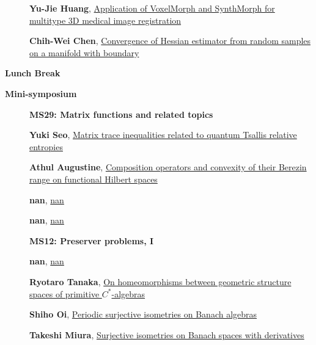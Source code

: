 \documentclass[ILAS2025-program.tex]{subfiles}
\begin{document}
\begin{description}
\begin{description}
        \item[] \hypertarget{up0151}{}\textbf{Yu-Jie Huang}, \hyperlink{down0151}{Application of VoxelMorph and SynthMorph for multitype 3D medical image registration}
        \item[] \hypertarget{up0152}{}\textbf{Chih-Wei Chen}, \hyperlink{down0152}{Convergence of Hessian estimator from random samples on a manifold with boundary}
        \end{description}
    \item[\info{12:00\textrm{--}13:30}] \textbf{Lunch Break} \info{}
    \item[\info{13:30\textrm{--}15:30}] \textbf{Mini-symposium} 
    \begin{description}
    \item[] {\color{mstitle}\textbf{MS29: Matrix functions and related topics}} 
    \item[] \hypertarget{up0157}{}\textbf{Yuki Seo}, \hyperlink{down0157}{Matrix trace inequalities related to quantum Tsallis relative entropies
}
        \item[] \hypertarget{up0158}{}\textbf{Athul Augustine}, \hyperlink{down0158}{Composition operators and convexity of their Berezin range on functional Hilbert spaces}
        \item[] \hypertarget{up0159}{}\textbf{nan}, \hyperlink{down0159}{nan}
        \item[] \hypertarget{up0160}{}\textbf{nan}, \hyperlink{down0160}{nan}
        \end{description}
    \begin{description}
    \item[] {\color{mstitle}\textbf{MS12: Preserver problems, I}} 
    \item[] \hypertarget{up0161}{}\textbf{nan}, \hyperlink{down0161}{nan}
        \item[] \hypertarget{up0162}{}\textbf{Ryotaro Tanaka}, \hyperlink{down0162}{On homeomorphisms between geometric structure spaces of primitive $C^*$-algebras}
        \item[] \hypertarget{up0163}{}\textbf{Shiho Oi}, \hyperlink{down0163}{Periodic surjective isometries on Banach algebras}
        \item[] \hypertarget{up0164}{}\textbf{Takeshi Miura}, \hyperlink{down0164}{Surjective isometries on Banach spaces with derivatives}

\end{description}
\end{description}
\end{document}
